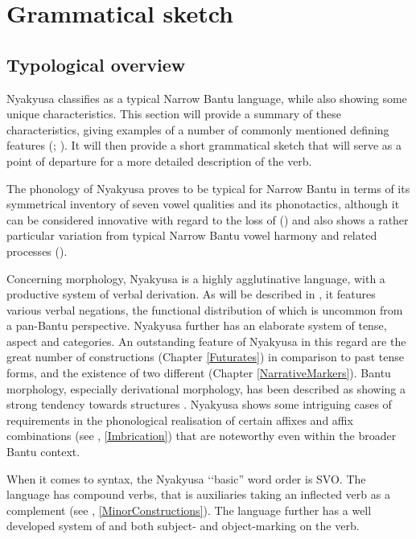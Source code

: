 \chapter{Grammatical sketch}
\section{Typological overview}
Nyakyusa classifies as a typical Narrow Bantu language, while also showing some unique characteristics. This section will provide a summary of these characteristics, giving examples of a number of commonly mentioned defining features (\citealt{MoehligW1981}; \citealt{NurseDPhillipsonG2003a}). It will then provide a short grammatical sketch that will serve as a point of departure for a more detailed description of the verb.

The phonology of Nyakyusa proves to be typical for Narrow Bantu in terms of its symmetrical inventory of seven vowel qualities and its phonotactics, although it can be considered innovative with regard to the loss of  () and also shows a rather particular variation from typical Narrow Bantu vowel harmony and related processes ().

Concerning morphology, Nyakyusa is a highly agglutinative language, with a productive system of verbal derivation. As will be described in , it features various verbal negations, the functional distribution of which is uncommon from a pan-Bantu perspective. Nyakyusa further has an elaborate system of tense, aspect and  categories. An outstanding feature of Nyakyusa in this regard are the great number of  constructions (Chapter \ref{Futurates}) in comparison to past tense forms, and the existence of two different  (Chapter \ref{NarrativeMarkers}). Bantu morphology, especially derivational morphology, has been described as showing a strong tendency towards  structures \citep{HymanL2002}. Nyakyusa shows some intriguing cases of  requirements in the phonological realisation of certain affixes and affix combinations (see , \ref{Imbrication}) that are noteworthy even within the broader Bantu context.

When it comes to syntax, the Nyakyusa \lq\lq basic'' word order is SVO. The language has compound verbs, that is auxiliaries taking an inflected verb as a complement (see , \ref{MinorConstructions}). The language further has a well developed system of  and both subject- and object-marking on the verb.

